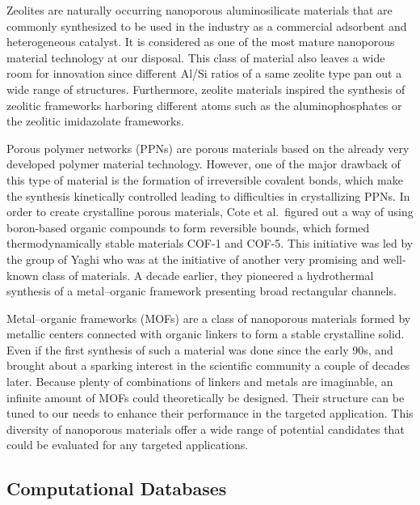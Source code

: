 \documentclass[main.tex]{subfiles}
\begin{document}
Zeolites are naturally occurring nanoporous aluminosilicate materials that are commonly synthesized to be used in the industry as a commercial adsorbent and heterogeneous catalyst.\cite{Ozin_1989,Ma_2000} It is considered as one of the most mature nanoporous material technology at our disposal. This class of material also leaves a wide room for innovation since different Al/Si ratios of a same zeolite type pan out a wide range of structures. Furthermore, zeolite materials inspired the synthesis of zeolitic frameworks harboring different atoms such as the aluminophosphates or the zeolitic imidazolate frameworks.\cite{Wang_2012,Chen_2014_zeo} 

Porous polymer networks (PPNs) are porous materials based on the already very developed polymer material technology.\cite{Lu_2010,Wang_2020,Che_2020} However, one of the major drawback of this type of material is the formation of irreversible covalent bonds, which make the synthesis kinetically controlled leading to difficulties in crystallizing PPNs.\cite{Feng_2012} In order to create crystalline porous materials, Cote et al.\ figured out a way of using boron-based organic compounds to form reversible bounds, which formed thermodynamically stable materials COF-1 and COF-5.\cite{Cote_2005} This initiative was led by the group of Yaghi who was at the initiative of another very promising and well-known class of materials. A decade earlier,  they pioneered a hydrothermal synthesis of a metal--organic framework presenting broad rectangular channels.\cite{Yaghi_1995} 

Metal--organic frameworks (MOFs) are a class of nanoporous materials formed by metallic centers connected with organic linkers to form a stable crystalline solid. Even if the first synthesis of such a material was done since the early 90s,\cite{Abrahams_1991} and brought about a sparking interest in the scientific community a couple of decades later.\cite{Kuppler_2009,Furukawa_2013} Because plenty of combinations of linkers and metals are imaginable, an infinite amount of MOFs could theoretically be designed. Their structure can be tuned to our needs to enhance their performance in the targeted application.\cite{Ejsmont_2021} This diversity of nanoporous materials offer a wide range of potential candidates that could be evaluated for any targeted applications. 


\subsection{Computational Databases}
\end{document}
